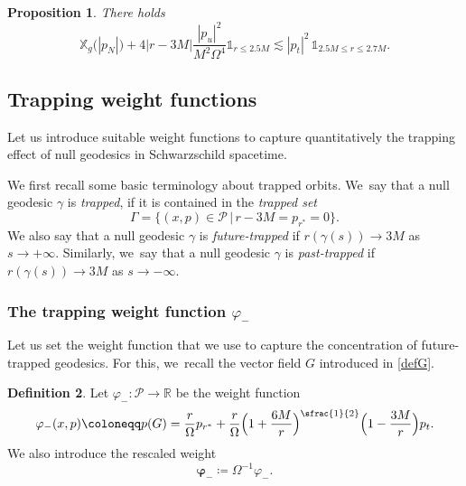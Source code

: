 \documentclass[10pt]{amsart}
\theoremstyle{plain}
\newtheorem{proposition}{Proposition}[section]
\theoremstyle{definition}
\newtheorem{definition}[proposition]{Definition}
\newcommand\R{{\mathbb{R}}}
\newcommand\T{{\mathbb{X}}}
\begin{document}
\begin{proposition}\label{Prorsweight}
There holds
\[
\T_g \bigl(|p_N| \bigr) +4|r-3M|\frac{|p_u|^2}{M^2\Omega^4} \mathds{1}_{r \leq 2.5M} \lesssim |p_t|^2 \, \mathds{1}_{2.5M \leq r \leq 2.7M}.
\]
\end{proposition}

\subsection{Trapping weight functions}\label{Subsecvarphi}

Let us introduce suitable weight functions to capture quantitatively the trapping effect of null geodesics in Schwarzschild spacetime.

We first recall some basic terminology about trapped orbits. We~say that a null geodesic $\gamma$ is \emph{trapped}, if it is contained in the \emph{trapped set}
\[
\Gamma=\bigl\{ (x,p)\in \mathcal{P} \, \big| \, r-3M=p_{r^*}=0 \bigr\}.
\]
We also say that a null geodesic $\gamma$ is \emph{future-trapped} if $r(\gamma(s))\to 3M$ as $s\to+\infty$. Similarly, we~say that a null geodesic $\gamma$ is \emph{past-trapped} if $r(\gamma(s))\to 3M$ as $s\to-\infty$.

\subsubsection{The trapping weight function $\varphi_-$}

Let us set the weight function that we use to capture the concentration of future-trapped geodesics. For this, we~recall the vector field $G$ introduced in \eqref{defG}.

\begin{definition}\label{Defvarphimin}
Let $\varphi_{-} \colon \mathcal{P}\to \R$ be the weight function
\[
\varphi_{-}(x,p)\coloneqq p(G)= \frac{r }{\Omega} p_{r^*} +\frac{r}{\Omega}\Bigl(1+\frac{6M}{r}\Bigr)^{\sfrac{1}{2}}\Bigl(1-\frac{3M}{r}\Bigr)p_t.
\]
We also introduce the rescaled weight
\begin{equation}\label{eq:defovphi}
\pmb{\varphi}_- \coloneqq \Omega^{-1}\varphi_-.
\end{equation}
\end{definition}
\end{document}
